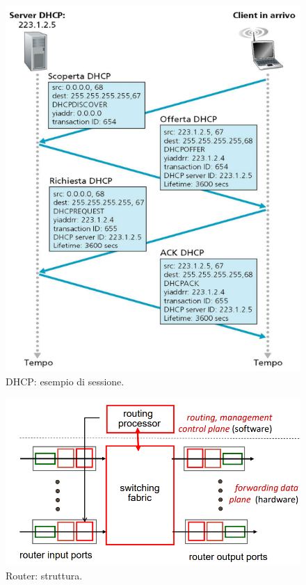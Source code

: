 \documentclass[11pt, italian, openany]{book}
\begin{document}
\begin{sloppypar}
\begin{figure}[!h]
	\centering
	\includegraphics[scale=0.5]{images/dhcp-esempio.png}
	\caption{DHCP: esempio di sessione.}
	\label{fig:dhcp-esempio}
\end{figure}

\pagebreak

\begin{figure}[!h]
	\centering
	\includegraphics[scale=0.35]{images/routers-struttura.png}
	\caption{Router: struttura.}
	\label{fig:routers-struttura}
\end{figure}


\end{sloppypar}
\end{document}
